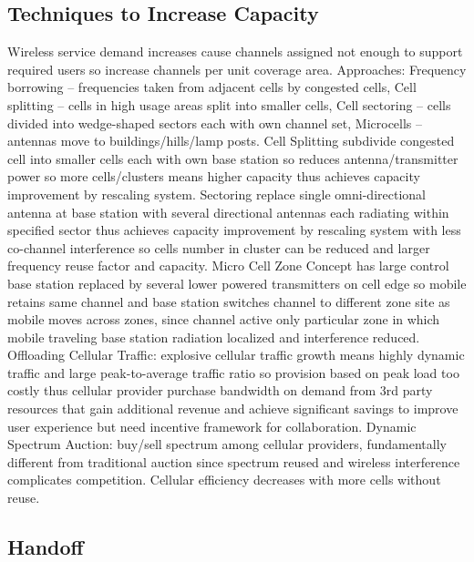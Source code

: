 \documentclass[9pt]{extarticle}
\begin{document}
\begin{multicols}{2}
\subsection{Techniques to Increase Capacity}

Wireless service demand increases cause channels assigned not enough to support required users so increase channels per unit coverage area. Approaches: Frequency borrowing – frequencies taken from adjacent cells by congested cells, Cell splitting – cells in high usage areas split into smaller cells, Cell sectoring – cells divided into wedge-shaped sectors each with own channel set, Microcells – antennas move to buildings/hills/lamp posts. Cell Splitting subdivide congested cell into smaller cells each with own base station so reduces antenna/transmitter power so more cells/clusters means higher capacity thus achieves capacity improvement by rescaling system. Sectoring replace single omni-directional antenna at base station with several directional antennas each radiating within specified sector thus achieves capacity improvement by rescaling system with less co-channel interference so cells number in cluster can be reduced and larger frequency reuse factor and capacity. Micro Cell Zone Concept has large control base station replaced by several lower powered transmitters on cell edge so mobile retains same channel and base station switches channel to different zone site as mobile moves across zones, since channel active only particular zone in which mobile traveling base station radiation localized and interference reduced. Offloading Cellular Traffic: explosive cellular traffic growth means highly dynamic traffic and large peak-to-average traffic ratio so provision based on peak load too costly thus cellular provider purchase bandwidth on demand from 3rd party resources that gain additional revenue and achieve significant savings to improve user experience but need incentive framework for collaboration. Dynamic Spectrum Auction: buy/sell spectrum among cellular providers, fundamentally different from traditional auction since spectrum reused and wireless interference complicates competition. Cellular efficiency decreases with more cells without reuse.

\subsection{Handoff}


\end{multicols}
\end{document}

